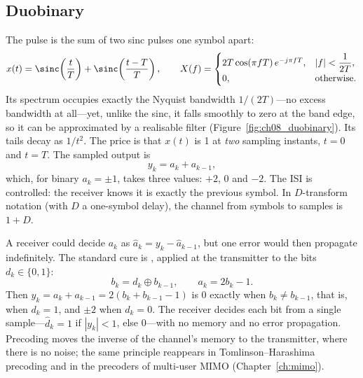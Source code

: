 \subsection{Duobinary}

The  pulse is the sum of two sinc pulses one symbol apart:
\begin{equation}
x(t)=\sinc\!\left(\frac tT\right)+\sinc\!\left(\frac{t-T}{T}\right),\qquad
X(f)=\begin{cases}2T\cos(\pi fT)\,e^{-j\pi fT},&|f|<\dfrac1{2T},\\0,&\text{otherwise.}\end{cases}
\label{eq:ch08:duobinary}
\end{equation}
Its spectrum occupies exactly the Nyquist bandwidth $1/(2T)$---no excess bandwidth at all---yet,
unlike the sinc, it falls smoothly to zero at the band edge, so it can be approximated by a
realisable filter (Figure~\ref{fig:ch08_duobinary}). Its tails decay as $1/t^2$. The price is
that $x(t)$ is 1 at \emph{two} sampling instants, $t=0$ and $t=T$. The sampled output is
\begin{equation}
y_k=a_k+a_{k-1},
\end{equation}
which, for binary $a_k=\pm1$, takes three values: $+2$, $0$ and $-2$. The ISI is controlled: the
receiver knows it is exactly the previous symbol. In $D$-transform notation (with $D$ a one-symbol
delay), the channel from symbols to samples is $1+D$.


A receiver could decide $a_k$ as $\hat a_k=y_k-\hat a_{k-1}$, but one error would then propagate
indefinitely. The standard cure is , applied at the transmitter to the bits
$d_k\in\{0,1\}$:
\begin{equation}
b_k=d_k\oplus b_{k-1},\qquad a_k=2b_k-1.
\end{equation}
Then $y_k=a_k+a_{k-1}=2(b_k+b_{k-1}-1)$ is 0 exactly when $b_k\ne b_{k-1}$, that is, when
$d_k=1$, and $\pm2$ when $d_k=0$. The receiver decides each bit from a single sample---$\hat d_k=1$
if $|y_k|<1$, else 0---with no memory and no error propagation. Precoding moves the inverse of
the channel's memory to the transmitter, where there is no noise; the same principle reappears
in Tomlinson--Harashima precoding and in the precoders of multi-user MIMO
(Chapter~\ref{ch:mimo}).

